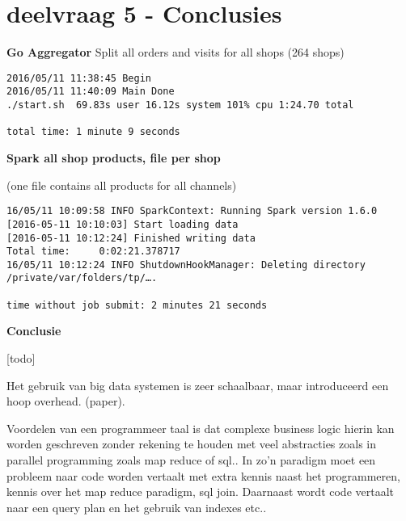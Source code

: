 \clearpage

\section{deelvraag 5 - Conclusies}
\label{sec:deelvraag5}

\textbf{Go Aggregator}
Split all orders and visits for all shops (264 shops)

\begin{lstlisting}
2016/05/11 11:38:45 Begin
2016/05/11 11:40:09 Main Done
./start.sh  69.83s user 16.12s system 101% cpu 1:24.70 total

total time: 1 minute 9 seconds
\end{lstlisting}

\textbf{Spark all shop products, file per shop}

(one file contains all products for all channels)

\begin{lstlisting}
16/05/11 10:09:58 INFO SparkContext: Running Spark version 1.6.0
[2016-05-11 10:10:03] Start loading data
[2016-05-11 10:12:24] Finished writing data
Total time:     0:02:21.378717
16/05/11 10:12:24 INFO ShutdownHookManager: Deleting directory /private/var/folders/tp/….

time without job submit: 2 minutes 21 seconds
\end{lstlisting}


\textbf{Conclusie}

[todo]

Het gebruik van big data systemen is zeer schaalbaar, maar introduceerd een hoop overhead. (paper). 

Voordelen van een programmeer taal is dat complexe business logic hierin kan worden geschreven zonder rekening te houden met veel abstracties zoals in parallel programming zoals map reduce of sql.. In zo'n paradigm moet een probleem naar code worden vertaalt met extra kennis naast het programmeren, kennis over het map reduce paradigm, sql join. Daarnaast wordt code vertaalt naar een query plan en het gebruik van indexes etc..

